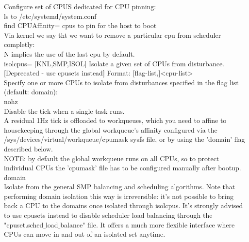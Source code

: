 \documentclass[11pt, a4paper, oneside]{article}
\theoremstyle{definition}
\begin{document}
Configure set of CPUS dedicated for CPU pinning:\\
ls to /etc/systemd/system.conf\\
find CPUAffinity= cpus to pin for the host to boot\\

Via kernel we say tht we want to remove a particular cpu from scheduler completly:\\
N implies the use of the last cpu by default.\\
isolcpus=       [KNL,SMP,ISOL] Isolate a given set of CPUs from disturbance.
                        [Deprecated - use cpusets instead]
                        Format: [flag-list,]<cpu-list>\\

                        Specify one or more CPUs to isolate from disturbances
                        specified in the flag list (default: domain):\\

                        nohz\\
                          Disable the tick when a single task runs.\\

                          A residual 1Hz tick is offloaded to workqueues, which you
                          need to affine to housekeeping through the global
                          workqueue's affinity configured via the
                          /sys/devices/virtual/workqueue/cpumask sysfs file, or
                          by using the 'domain' flag described below.\\

                          NOTE: by default the global workqueue runs on all CPUs,
                          so to protect individual CPUs the 'cpumask' file has to
                          be configured manually after bootup.\\

                        domain\\
                          Isolate from the general SMP balancing and scheduling
                          algorithms. Note that performing domain isolation this way
                          is irreversible: it's not possible to bring back a CPU to
                          the domains once isolated through isolcpus. It's strongly
                          advised to use cpusets instead to disable scheduler load
                          balancing through the "cpuset.sched$\_$load$\_$balance" file.
                          It offers a much more flexible interface where CPUs can
                          move in and out of an isolated set anytime.\\
\end{document}
